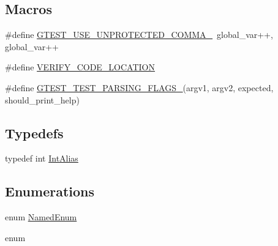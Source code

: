 \subsection*{Macros}
\begin{DoxyCompactItemize}
\item 
\#define \mbox{\hyperlink{_obj__test_2lib_2googletest-release-1_88_81_2googletest_2test_2gtest__unittest_8cc_ad42d1faf4b99498972bc2e03f236521a}{G\+T\+E\+S\+T\+\_\+\+U\+S\+E\+\_\+\+U\+N\+P\+R\+O\+T\+E\+C\+T\+E\+D\+\_\+\+C\+O\+M\+M\+A\+\_\+}}~global\+\_\+var++, global\+\_\+var++
\item 
\#define \mbox{\hyperlink{_obj__test_2lib_2googletest-release-1_88_81_2googletest_2test_2gtest__unittest_8cc_a7720eac5c0fc782a0447f4479923c7bd}{V\+E\+R\+I\+F\+Y\+\_\+\+C\+O\+D\+E\+\_\+\+L\+O\+C\+A\+T\+I\+ON}}
\item 
\#define \mbox{\hyperlink{_obj__test_2lib_2googletest-release-1_88_81_2googletest_2test_2gtest__unittest_8cc_a0c91cd98ee7f96c5c1247f852e46d700}{G\+T\+E\+S\+T\+\_\+\+T\+E\+S\+T\+\_\+\+P\+A\+R\+S\+I\+N\+G\+\_\+\+F\+L\+A\+G\+S\+\_\+}}(argv1,  argv2,  expected,  should\+\_\+print\+\_\+help)
\end{DoxyCompactItemize}
\subsection*{Typedefs}
\begin{DoxyCompactItemize}
\item 
typedef int \mbox{\hyperlink{_obj__test_2lib_2googletest-release-1_88_81_2googletest_2test_2gtest__unittest_8cc_a89319972d5a831dd6877a3e502ec57ff}{Int\+Alias}}
\end{DoxyCompactItemize}
\subsection*{Enumerations}
\begin{DoxyCompactItemize}
\item 
enum \mbox{\hyperlink{_obj__test_2lib_2googletest-release-1_88_81_2googletest_2test_2gtest__unittest_8cc_ae0610bad70a3b53c94ee9db54f6f732b}{Named\+Enum}} 
\item 
enum 
\end{DoxyCompactItemize}
